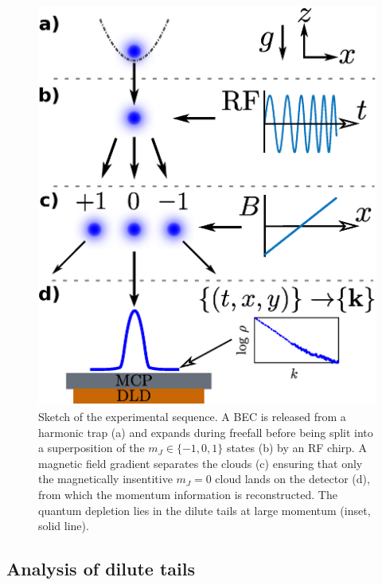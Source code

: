 \begin{figure}
  \begin{minipage}[t]{0.4\textwidth}
  \vspace{0pt}
	    \caption{Sketch of the experimental sequence. A BEC is released from a harmonic trap %
	    (a) and expands during freefall before being split into a superposition of the $m_J\in\{-1,0,1\}$ states (b) by an RF chirp. A magnetic field gradient separates the clouds (c) ensuring that only the magnetically insentitive $m_J=0$ cloud lands on the detector (d), from which the momentum information is reconstructed. The quantum depletion lies in the dilute tails at large momentum (inset, solid line).}
	    \label{fig:sequence}
  \end{minipage}\hfill
  \begin{minipage}[t]{0.5\textwidth}
  \vspace{0pt}
  \includegraphics[width=\textwidth]{fig/QD/exp_cartoon}
  \end{minipage}
\end{figure}
	


\subsection{Analysis of dilute tails} 
\label{sec:analysis}

